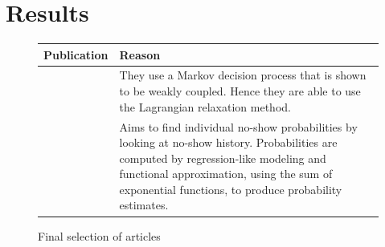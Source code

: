 \documentclass[a4paper,12pt]{article}
\begin{document}
\section*{Results}

\begin{figure}[H]
    \begin{table}[H]
    \begin{tabularx}{\textwidth}{@{} c Y @{}}
    \toprule
    Publication & Reason \\ \midrule
    \cite{BD29}        &    They use a Markov decision process that is shown to be weakly coupled. Hence they are able to use the Lagrangian relaxation method. \\
    \cite{BD25}        &    Aims to find individual no-show probabilities by looking at no-show history. Probabilities are computed by regression-like modeling and functional approximation, using the sum of exponential functions, to produce probability estimates. \\
    \bottomrule
    \end{tabularx}
    \end{table}
    \caption{Final selection of articles}
    \label{good}
\end{figure}
\end{document}
